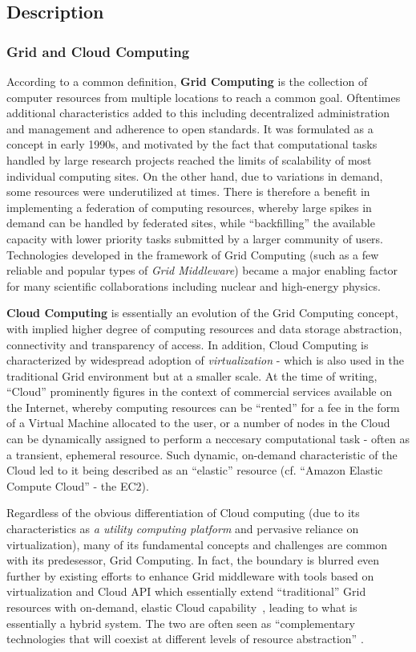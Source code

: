 \subsection{Description}

\subsubsection{Grid and Cloud Computing}
According to a common definition, \textbf{Grid Computing} is the collection of computer resources from multiple locations to reach a common goal. Oftentimes additional characteristics added to this including decentralized
administration and management and adherence to open standards. It was formulated as a concept in early 1990s, and motivated by the fact that computational tasks handled by large research projects reached
the limits of scalability of most individual computing sites. On the other hand, due to variations in demand, some resources were underutilized at times. There is therefore a benefit in implementing a federation of
computing resources, whereby large spikes in demand can be handled by federated sites, while ``backfilling'' the available capacity with lower priority tasks submitted by a larger community of users.
Technologies developed in the framework of Grid Computing (such as a few reliable and popular types of \textit{Grid Middleware}) became a major enabling factor for many scientific collaborations including
nuclear and high-energy physics.

\textbf{Cloud Computing} is essentially an evolution of the Grid Computing concept, with implied higher degree of computing resources and data storage abstraction, connectivity and transparency of access.
In addition, Cloud Computing is characterized by widespread adoption of \textit{virtualization} - which is also used in the traditional Grid environment but at a smaller scale.
At the time of writing, ``Cloud'' prominently figures in the context of commercial services available on the Internet, whereby computing resources can be ``rented'' for a fee in the form of a Virtual Machine allocated
to the user, or a  number of nodes in the Cloud can be dynamically assigned to perform a neccesary computational task - often as a transient, ephemeral resource. Such dynamic, on-demand characteristic
of the Cloud led to it being described as an ``elastic'' resource (cf. ``Amazon Elastic Compute Cloud'' - the EC2).

Regardless of the obvious differentiation of Cloud computing (due to its characteristics as \textit{a utility computing platform} and pervasive reliance on virtualization), many of its fundamental concepts
and challenges are common with its predesessor, Grid Computing. In fact, the boundary is blurred even further by existing efforts to enhance
Grid middleware with tools based on virtualization and Cloud API which essentially extend ``traditional'' Grid resources with on-demand, elastic Cloud capability~\cite{star_acat11},
leading to what is essentially a hybrid system. The two are often seen as ``complementary technologies that will coexist at different levels of resource abstraction'' \cite{atlas_cloud_chep13}.

